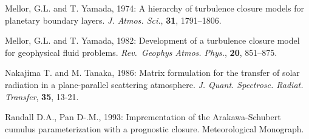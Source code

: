 Mellor, G.L. and T. Yamada, 1974: A hierarchy of turbulence closure
models for planetary boundary layers. {\emph{J. Atmos. Sci.}},
{\textbf{31}}, 1791--1806.

Mellor, G.L. and T. Yamada, 1982: Development of a turbulence closure
model for geophysical fluid problems. {\emph{Rev.~Geophys Atmos.
Phys.}}, {\textbf{20}}, 851--875.

Nakajima T. and M. Tanaka, 1986: Matrix formulation for the transfer of
solar radiation in a plane-parallel scattering atmosphere. {\emph{J.
Quant. Spectrosc. Radiat. Transfer}}, {\textbf{35}}, 13-21.

Randall D.A., Pan D-.M., 1993: Imprementation of the Arakawa-Schubert
cumulus parameterization with a prognostic closure. {Meteorological
Monograph.}
